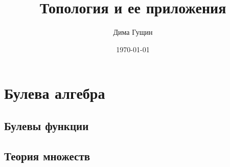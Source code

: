 \documentclass[12pt, oneside]{book}
\author{Дима Гущин}
\title{Топология и ее приложения}
\date{\today}
\begin{document}
	
	
		
	
		
	
	\chapter{Булева алгебра}
	 
		\section{Булевы функции}
		
		
		
		
		
		\section{Теория множеств}
		
		
		
		
		
		
	\titlespacing*{\chapter}{0pt}{0pt}{40pt}
	
\end{document}
